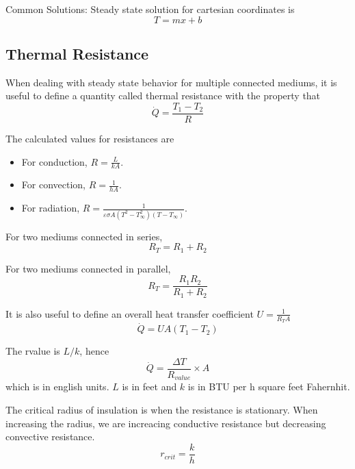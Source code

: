 \documentclass[a4paper]{article}
\numberwithin{equation}{section}
\begin{document}
	Common Solutions:
	Steady state solution for cartesian coordinates is
	\begin{equation}
		T = mx+b
	\end{equation}

	\subsection{Thermal Resistance}

	When dealing with steady state behavior for multiple connected mediums, it is useful to define a quantity called thermal resistance with the property that 
	\begin{equation}
		\dot Q=\frac{T_1-T_2}{R}
	\end{equation}

	The calculated values for resistances are
	\begin{itemize}
		\item For conduction, $R=\frac{L}{kA}$.
		\item For convection, $R=\frac{1}{hA}$.
		\item For radiation, $R=\frac{1}{\varepsilon\sigma A(T^2-T_\infty^2)(T-T_\infty)}$.
	\end{itemize}

	For two mediums connected in series,
	\begin{equation}
		R_T=R_1+R_2
	\end{equation}

	For two mediums connected in parallel,
	\begin{equation}
		R_T=\frac{R_1R_2}{R_1+R_2}
	\end{equation}

	It is also useful to define an overall heat transfer coefficient $U=\frac{1}{R_TA}$
	\begin{equation}
		\dot Q=UA(T_1-T_2)
	\end{equation}

	The rvalue is $L/k$, hence
	\begin{equation}
		\dot Q=\frac{\Delta T}{R_{value}}\times A
	\end{equation}
	which is in english units. $L$ is in feet and $k$ is in BTU per h square feet Fahernhit.

	The critical radius of insulation is when the resistance is stationary. When increasing the radius, we are increacing conductive resistance but decreasing convective resistance. 
	\begin{equation}
		r_{crit}=\frac{k}{h}
	\end{equation}
   
\end{document}
